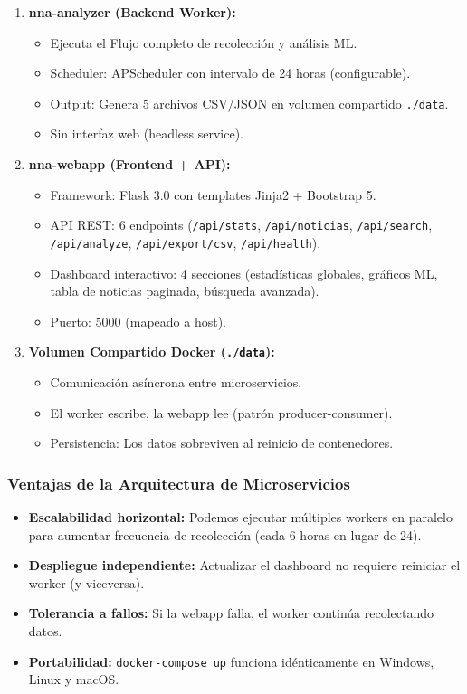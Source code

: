 \begin{enumerate}
    \item \textbf{nna-analyzer (Backend Worker):}
    \begin{itemize}
        \item Ejecuta el Flujo completo de recolección y análisis ML.
        \item Scheduler: APScheduler con intervalo de 24 horas (configurable).
        \item Output: Genera 5 archivos CSV/JSON en volumen compartido \texttt{./data}.
        \item Sin interfaz web (headless service).
    \end{itemize}
    
    \item \textbf{nna-webapp (Frontend + API):}
    \begin{itemize}
        \item Framework: Flask 3.0 con templates Jinja2 + Bootstrap 5.
        \item API REST: 6 endpoints (\texttt{/api/stats}, \texttt{/api/noticias}, \texttt{/api/search}, \texttt{/api/analyze}, \texttt{/api/export/csv}, \texttt{/api/health}).
        \item Dashboard interactivo: 4 secciones (estadísticas globales, gráficos ML, tabla de noticias paginada, búsqueda avanzada).
        \item Puerto: 5000 (mapeado a host).
    \end{itemize}
    
    \item \textbf{Volumen Compartido Docker (\texttt{./data}):}
    \begin{itemize}
        \item Comunicación asíncrona entre microservicios.
        \item El worker escribe, la webapp lee (patrón producer-consumer).
        \item Persistencia: Los datos sobreviven al reinicio de contenedores.
    \end{itemize}
\end{enumerate}

\subsubsection{Ventajas de la Arquitectura de Microservicios}

\begin{itemize}
    \item \textbf{Escalabilidad horizontal:} Podemos ejecutar múltiples workers en paralelo para aumentar frecuencia de recolección (cada 6 horas en lugar de 24).
    \item \textbf{Despliegue independiente:} Actualizar el dashboard no requiere reiniciar el worker (y viceversa).
    \item \textbf{Tolerancia a fallos:} Si la webapp falla, el worker continúa recolectando datos.
    \item \textbf{Portabilidad:} \texttt{docker-compose up} funciona idénticamente en Windows, Linux y macOS.
\end{itemize}

